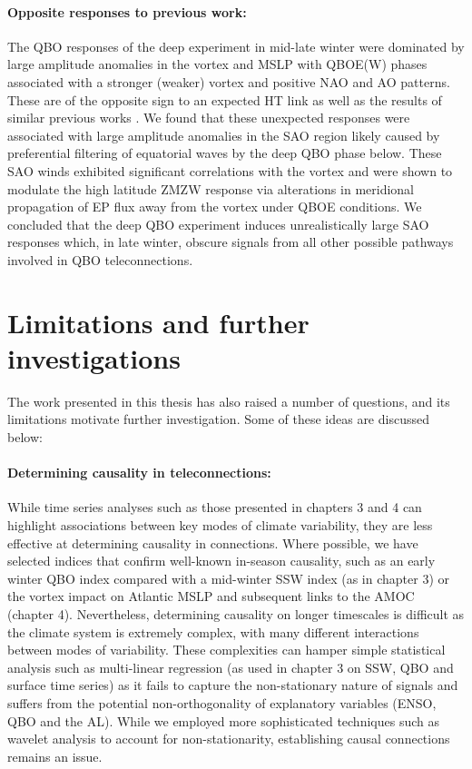 \paragraph{Opposite responses to previous work:}
The QBO responses of the deep experiment in mid-late winter were dominated by large amplitude anomalies in the vortex and MSLP with QBOE(W) phases associated with a stronger (weaker) vortex and positive NAO and AO patterns. These are of the opposite sign to an expected HT link as well as the results of similar previous works \citep{graySurface2018b, andrewsObserved2019d}. We found that these unexpected responses were associated with large amplitude anomalies in the SAO region likely caused by preferential filtering of equatorial waves by the deep QBO phase below. These SAO winds exhibited significant correlations with the vortex and were shown to modulate the high latitude ZMZW response via alterations in meridional propagation of EP flux away from the vortex under QBOE conditions. We concluded that the deep QBO experiment induces unrealistically large SAO responses which, in late winter, obscure signals from all other possible pathways involved in QBO teleconnections. 

\section{Limitations and further investigations}
\label{sec:limitations}
The work presented in this thesis has also raised a number of questions, and its limitations motivate further investigation. Some of these ideas are discussed below:

\paragraph{Determining causality in teleconnections:}
While time series analyses such as those presented in chapters 3 and 4 can highlight associations between key modes of climate variability, they are less effective at determining causality in connections. Where possible, we have selected indices that confirm well-known in-season causality, such as an early winter QBO index compared with a mid-winter SSW index (as in chapter 3) or the vortex impact on Atlantic MSLP and subsequent links to the AMOC (chapter 4). Nevertheless, determining causality on longer timescales is difficult as the climate system is extremely complex, with many different interactions between modes of variability. These complexities can hamper simple statistical analysis such as multi-linear regression (as used in chapter 3 on SSW, QBO and surface time series) as it fails to capture the non-stationary nature of signals and suffers from the potential non-orthogonality of explanatory variables (ENSO, QBO and the AL). While we employed more sophisticated techniques such as wavelet analysis to account for non-stationarity, establishing causal connections remains an issue.

